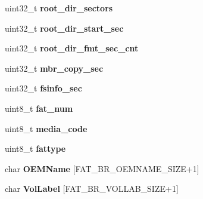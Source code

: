 \begin{DoxyCompactItemize}
uint32\+\_\+t {\bfseries root\+\_\+dir\+\_\+sectors}
\item 
\mbox{\label{structmsdos__format__param__t_ad1e7ef5684d1ce23fbeb91ac2c2dc396}} 
uint32\+\_\+t {\bfseries root\+\_\+dir\+\_\+start\+\_\+sec}
\item 
\mbox{\label{structmsdos__format__param__t_a6e6dc929773c5dfe33533e410a601259}} 
uint32\+\_\+t {\bfseries root\+\_\+dir\+\_\+fmt\+\_\+sec\+\_\+cnt}
\item 
\mbox{\label{structmsdos__format__param__t_a176d74541c3b8242e1e27080fd0b4967}} 
uint32\+\_\+t {\bfseries mbr\+\_\+copy\+\_\+sec}
\item 
\mbox{\label{structmsdos__format__param__t_a28b1f0b98722c29efea3080eacc75005}} 
uint32\+\_\+t {\bfseries fsinfo\+\_\+sec}
\item 
\mbox{\label{structmsdos__format__param__t_a6d951eb15d822149f8f882efbdc18807}} 
uint8\+\_\+t {\bfseries fat\+\_\+num}
\item 
\mbox{\label{structmsdos__format__param__t_a3bfe3063babfcaf396fea37b30d83a1e}} 
uint8\+\_\+t {\bfseries media\+\_\+code}
\item 
\mbox{\label{structmsdos__format__param__t_a962eda68501641ad29f537d0ea4e41db}} 
uint8\+\_\+t {\bfseries fattype}
\item 
\mbox{\label{structmsdos__format__param__t_ae868d065819508b4af46b0ec6e2ecd4c}} 
char {\bfseries O\+E\+M\+Name} \mbox{[}F\+A\+T\+\_\+\+B\+R\+\_\+\+O\+E\+M\+N\+A\+M\+E\+\_\+\+S\+I\+ZE+1\mbox{]}
\item 
\mbox{\label{structmsdos__format__param__t_a109f792a9308fc43a2683cd3a44ca106}} 
char {\bfseries Vol\+Label} \mbox{[}F\+A\+T\+\_\+\+B\+R\+\_\+\+V\+O\+L\+L\+A\+B\+\_\+\+S\+I\+ZE+1\mbox{]}
\item 
\mbox{\label{structmsdos__format__param__t_a0bbbd399c511520a7b733f42e0cc54fa}} 

\end{DoxyCompactItemize}
